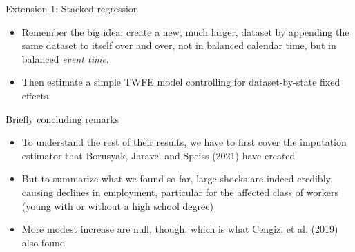 \documentclass{beamer}
\begin{document}
\begin{frame}{Extension 1: Stacked regression}

\begin{itemize}
\item Remember the big idea: create a new, much larger, dataset by appending the same dataset to itself over and over, not in balanced calendar time, but in balanced \emph{event time}.
\item Then estimate a simple TWFE model controlling for dataset-by-state fixed effects
\end{itemize}

\end{frame}



\begin{frame}{Briefly concluding remarks}

\begin{itemize}
\item To understand the rest of their results, we have to first cover the imputation estimator that Borusyak, Jaravel and Speiss (2021) have created
\item But to summarize what we found so far, large shocks are indeed credibly causing declines in employment, particular for the affected class of workers (young with or without a high school degree)
\item More modest increase are null, though, which is what Cengiz, et al. (2019) also found
\end{itemize}

\end{frame}
\end{document}
